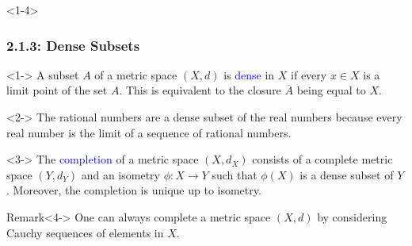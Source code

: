 \documentclass[10pt,english,aspectratio=169]{beamer}
\begin{document}
\begin{frame}<1-4> \frametitle{2.1.3: Dense Subsets}

\begin{definition}<1->
A subset $A$ of a metric space $(X,d)$ is \textcolor{blue}{dense} in $X$ if every $x\in X$ is a limit point of the set $A$.
This is equivalent to the closure $\overline{A}$ being equal to $X$.
\end{definition}

\begin{example}<2->
The rational numbers are a dense subset of the real numbers because every real number is the limit of a sequence of rational numbers.
\end{example}

\begin{definition}<3->
The \textcolor{blue}{completion} of a metric space $(X,d_X)$ consists of a complete metric space $(Y,d_Y)$ and an isometry $\phi  \colon X \rightarrow Y$ such that $\phi(X)$ is a dense subset of $Y$.
Moreover, the completion is unique up to isometry.
\end{definition}

\begin{alertblock}{Remark}<4->
One can always complete a metric space $(X,d)$ by considering Cauchy sequences of elements in $X$.
\end{alertblock}


\end{frame}
\end{document}
